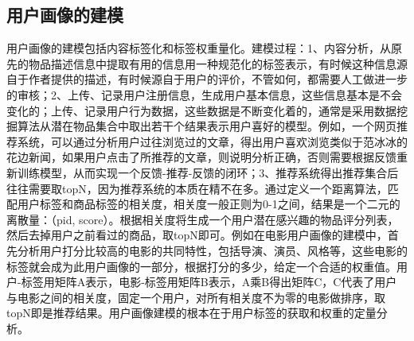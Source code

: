 		\begin{figure}
	    \centering
	      \label{pic:user_profile}
	    \end{figure}

		\subsection{用户画像的建模}
		用户画像的建模包括内容标签化和标签权重量化。建模过程：1、内容分析，从原先的物品描述信息中提取有用的信息用一种规范化的标签表示，有时候这种信息源自于作者提供的描述，有时候源自于用户的评价，不管如何，都需要人工做进一步的审核；2、上传、记录用户注册信息，生成用户基本信息，这些信息基本是不会变化的；上传、记录用户行为数据，这些数据是不断变化着的，通常是采用数据挖掘算法从潜在物品集合中取出若干个结果表示用户喜好的模型。例如，一个网页推荐系统，可以通过分析用户过往浏览过的文章，得出用户喜欢浏览类似于范冰冰的花边新闻，如果用户点击了所推荐的文章，则说明分析正确，否则需要根据反馈重新训练模型，从而实现一个反馈-推荐-反馈的闭环；3、推荐系统得出推荐集合后往往需要取topN，因为推荐系统的本质在精不在多。通过定义一个距离算法，匹配用户标签和商品标签的相关度，相关度一般正则为0-1之间，结果是一个二元的离散量：（pid, score）。根据相关度将生成一个用户潜在感兴趣的物品评分列表，然后去掉用户之前看过的商品，取topN即可。例如在电影用户画像的建模中，首先分析用户打分比较高的电影的共同特性，包括导演、演员、风格等，这些电影的标签就会成为此用户画像的一部分，根据打分的多少，给定一个合适的权重值。用户-标签用矩阵A表示，电影-标签用矩阵B表示，A乘B得出矩阵C，C代表了用户与电影之间的相关度，固定一个用户，对所有相关度不为零的电影做排序，取topN即是推荐结果。用户画像建模的根本在于用户标签的获取和权重的定量分析。

